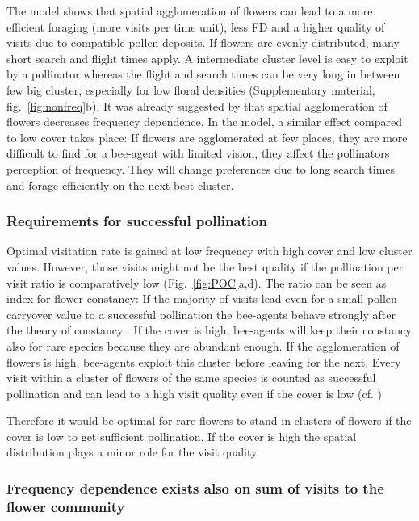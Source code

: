 The model shows that spatial agglomeration of flowers can lead to a more efficient foraging (more visits per time unit), less FD and a higher quality of visits due to compatible pollen deposits. If flowers are evenly distributed, many short search and flight times apply. A intermediate cluster level is easy to exploit by a pollinator whereas the flight and search times can be very long in between few big cluster, especially for low floral densities (Supplementary material, fig.~\ref{fig:nonfreq}b). 
It was already suggested by \cite{epperson1987frequency} that spatial agglomeration of flowers decreases frequency dependence. In the model, a similar effect compared to low cover takes place: If flowers are agglomerated at few places, they are more difficult to find for a bee-agent with limited vision, they affect the pollinators perception of frequency. They will change preferences due to long search times and forage efficiently on the next best cluster. 

\subsubsection*{Requirements for successful pollination}
Optimal visitation rate is gained at low frequency with high cover and low cluster values. However, those visits might not be the best quality if the pollination per visit ratio is comparatively low (Fig.~\ref{fig:POC}a,d). 
The ratio can be seen as index for flower constancy: If the majority of visits lead even for a small pollen-carryover value to a successful pollination the bee-agents behave strongly after the theory of constancy \citep{montgomery2009pollen}. If the cover is high, bee-agents will keep their constancy also for rare species because they are abundant enough. If the agglomeration of flowers is high, bee-agents exploit this cluster before leaving for the next. Every visit within a cluster of flowers of the same species is counted as successful pollination and can lead to a high visit quality even if the cover is low (cf. \citealt{jakobsson2009relationships})

Therefore it would be optimal for rare flowers to stand in clusters of flowers if the cover is low to get sufficient pollination. If the cover is high the spatial distribution plays a minor role for the visit quality.  

\subsubsection*{Frequency dependence exists also on sum of visits to the flower community}

